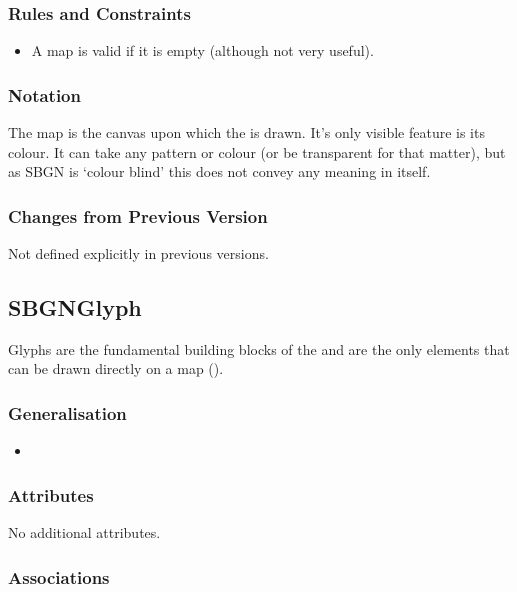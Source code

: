 \subsubsection{Rules and Constraints}

\begin{itemize}
\item A map is valid if it is empty (although not very useful).
\end{itemize}

\subsubsection{Notation}

The map is the canvas upon which the \PDl is drawn. It's only visible
feature is its colour. It can take any pattern or colour (or be
transparent for that matter), but as SBGN is `colour blind' this does
not convey any meaning in itself.

\subsubsection{Changes from Previous Version}

Not defined explicitly in previous versions.

\subsection{SBGNGlyph}

Glyphs are the fundamental building blocks of the \PDl and are the
only elements that can be drawn directly on a map ().

\subsubsection{Generalisation}

\begin{itemize}
\item {}
\end{itemize}

\subsubsection{Attributes}

No additional attributes.

\subsubsection{Associations}

